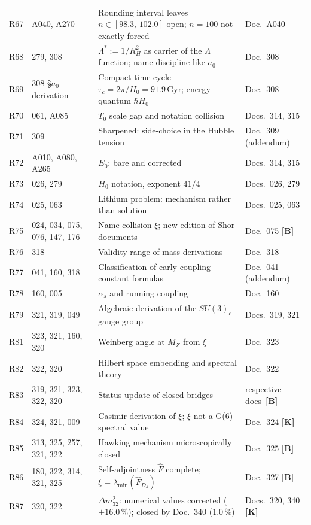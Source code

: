 \begin{longtable}{@{}p{1.2cm}p{3.4cm}p{5.8cm}p{3.4cm}@{}}
R67 & A040, A270 & Rounding interval leaves $n\in[98.3,\,102.0]$ open; $n=100$ not exactly forced & Doc.~A040 \\
R68 & 279, 308 & $\Lambda^{*}:=1/R_H^2$ as carrier of the $\Lambda$ function; name discipline like $a_0$ & Doc.~308 \\
R69 & 308 \S$a_0$ derivation & Compact time cycle $\tau_c=2\pi/H_0=91.9$\,Gyr; energy quantum $\hbar H_0$ & Doc.~308 \\
R70 & 061, A085 & $T_0$ scale gap and notation collision & Docs.~314, 315 \\
R71 & 309 & Sharpened: side-choice in the Hubble tension & Doc.~309 (addendum) \\
R72 & A010, A080, A265 & $E_0$: bare and corrected & Docs.~314, 315 \\
R73 & 026, 279 & $H_0$ notation, exponent $41/4$ & Docs.~026, 279 \\
R74 & 025, 063 & Lithium problem: mechanism rather than solution & Docs.~025, 063 \\
R75 & 024, 034, 075, 076, 147, 176 & Name collision $\xi$; new edition of Shor documents & Doc.~075 \textbf{[B]} \\
R76 & 318 & Validity range of mass derivations & Doc.~318 \\
R77 & 041, 160, 318 & Classification of early coupling-constant formulas & Doc.~041 (addendum) \\
R78 & 160, 005 & $\alpha_s$ and running coupling & Doc.~160 \\
R79 & 321, 319, 049 & Algebraic derivation of the $SU(3)_c$ gauge group & Docs.~319, 321 \\
R81 & 323, 321, 160, 320 & Weinberg angle at $M_Z$ from $\xi$ & Doc.~323 \\
R82 & 322, 320 & Hilbert space embedding and spectral theory & Doc.~322 \\
R83 & 319, 321, 323, 322, 320 & Status update of closed bridges & respective docs~\textbf{[B]} \\
R84 & 324, 321, 009 & Casimir derivation of $\xi$; $\xi$ not a G(6) spectral value & Doc.~324 \textbf{[K]} \\
R85 & 313, 325, 257, 321, 322 & Hawking mechanism microscopically closed & Doc.~325 \textbf{[B]} \\
R86 & 180, 322, 314, 321, 325 & Self-adjointness $\hat{F}$ complete; $\xi=\lambda_{\min}(\hat{F}_{D_4})$ & Doc.~327 \textbf{[B]} \\
R87 & 320, 322 & $\Delta m_{32}^2$: numerical values corrected ($+16.0\,\%$); closed by Doc.~340 ($1.0\,\%$) & Docs.~320, 340 \textbf{[K]} \\

\end{longtable}
